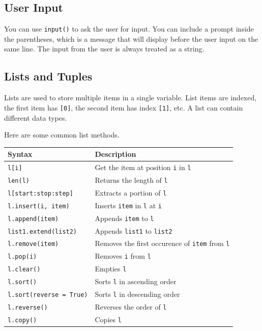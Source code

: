 \documentclass[11pt]{scrartcl}
\theoremstyle{definition}
\begin{document}
\subsection{User Input}
You can use \texttt{input()} to ask the user for input. You can include a prompt inside the parentheses, which 
is a message that will display before the user input on the same line. The input from the user is always 
treated as a string.

\subsection{Lists and Tuples}

Lists are used to store multiple items in a single variable. List items are indexed, the first item has 
\texttt{[0]}, the second item has index \texttt{[1]}, etc. A list can contain different 
data types. 

Here are some common list methods.

\begin{center}
\begin{tabular}{|l|l|} \hline
    \textbf{Syntax} & \textbf{Description} \\ \hline
    \texttt{l[i]} & Get the item at position \texttt{i} in \texttt{l} \\ \hline
    \texttt{len(l)} & Returns the length of \texttt{l} \\ \hline
    \texttt{l[start:stop:step]} & Extracts a portion of \texttt{l} \\ \hline
    \texttt{l.insert(i, item)} & Inserts \texttt{item} in \texttt{l} 
    at \texttt{i} \\ \hline
    \texttt{l.append(item)} & Appends \texttt{item} to \texttt{l} \\ \hline
    \texttt{list1.extend(list2)} & Appends \texttt{list1} to \texttt{list2} 
    \\ \hline
    \texttt{l.remove(item)} & Removes the first occurence of \texttt{item} from 
    \texttt{l} \\ \hline
    \texttt{l.pop(i)} & Removes \texttt{i} from \texttt{l} \\ \hline
    \texttt{l.clear()} & Empties \texttt{l} \\ \hline
    \texttt{l.sort()} & Sorts \texttt{l} in ascending order \\ \hline
    \texttt{l.sort(reverse = True)} & Sorts \texttt{l} in descending order \\ \hline
    \texttt{l.reverse()} & Reverses the order of \texttt{l} \\ \hline
    \texttt{l.copy()} & Copies \texttt{l} \\ \hline
\end{tabular}
\end{center}
\end{document}
